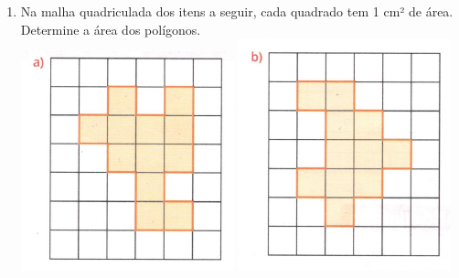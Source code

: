 \documentclass[a4paper,14pt]{article}
\begin{document}
\begin{multicols}{2}
\begin{enumerate}
			\item Na malha quadriculada dos itens a seguir, cada quadrado tem 1 cm² de área. Determine a área dos polígonos. \\
			\includegraphics[width=1\linewidth]{6FMA89_imagens/imagem07}
			\includegraphics[width=1\linewidth]{6FMA89_imagens/imagem08}

\end{enumerate}
\end{multicols}
\end{document}
